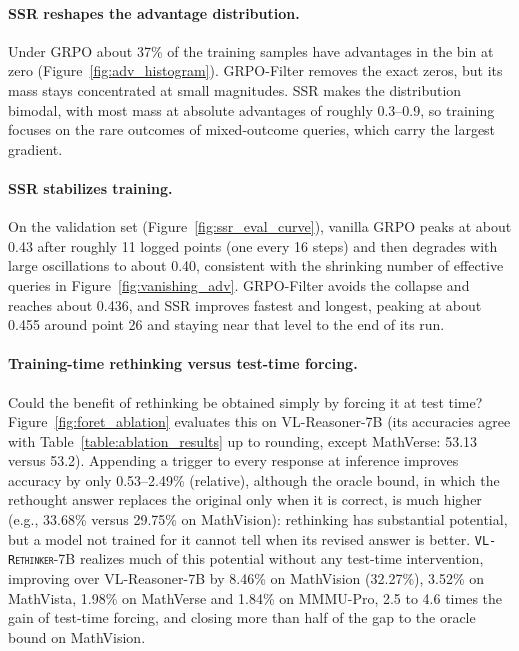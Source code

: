 \documentclass{article}
\newcommand{\model}{\texttt{\textsc{VL-Rethinker}}\xspace}
\begin{document}


\paragraph{SSR reshapes the advantage distribution.} Under GRPO about 37\% of the training samples have advantages in the bin at zero (Figure~\ref{fig:adv_histogram}). GRPO-Filter removes the exact zeros, but its mass stays concentrated at small magnitudes. SSR makes the distribution bimodal, with most mass at absolute advantages of roughly 0.3--0.9, so training focuses on the rare outcomes of mixed-outcome queries, which carry the largest gradient.

\paragraph{SSR stabilizes training.} On the validation set (Figure~\ref{fig:ssr_eval_curve}), vanilla GRPO peaks at about 0.43 after roughly 11 logged points (one every 16 steps) and then degrades with large oscillations to about 0.40, consistent with the shrinking number of effective queries in Figure~\ref{fig:vanishing_adv}. GRPO-Filter avoids the collapse and reaches about 0.436, and SSR improves fastest and longest, peaking at about 0.455 around point 26 and staying near that level to the end of its run.



\paragraph{Training-time rethinking versus test-time forcing.} Could the benefit of rethinking be obtained simply by forcing it at test time? Figure~\ref{fig:foret_ablation} evaluates this on VL-Reasoner-7B (its accuracies agree with Table~\ref{table:ablation_results} up to rounding, except MathVerse: 53.13 versus 53.2). Appending a trigger to every response at inference improves accuracy by only 0.53--2.49\% (relative), although the oracle bound, in which the rethought answer replaces the original only when it is correct, is much higher (e.g., 33.68\% versus 29.75\% on MathVision): rethinking has substantial potential, but a model not trained for it cannot tell when its revised answer is better. \model-7B realizes much of this potential without any test-time intervention, improving over VL-Reasoner-7B by 8.46\% on MathVision (32.27\%), 3.52\% on MathVista, 1.98\% on MathVerse and 1.84\% on MMMU-Pro, 2.5 to 4.6 times the gain of test-time forcing, and closing more than half of the gap to the oracle bound on MathVision.
\end{document}
